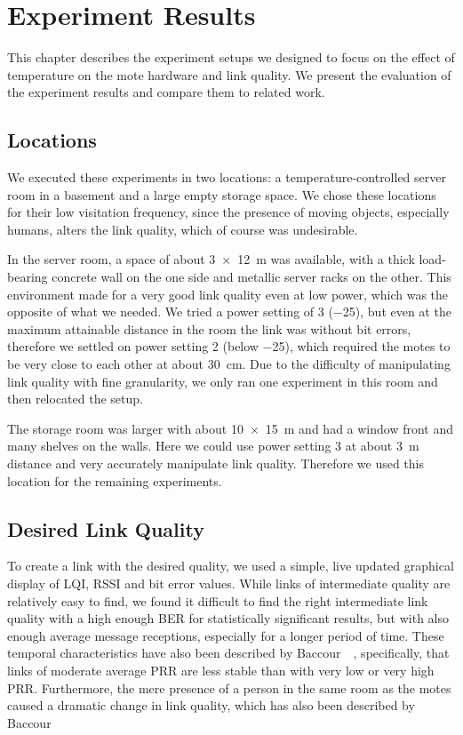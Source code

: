 \chapter{Experiment Results}
\label{chap:experiments}

This chapter describes the experiment setups we designed to focus on the effect of temperature on the mote hardware and link quality.
We present the evaluation of the experiment results and compare them to related work.

\section{Locations}

We executed these experiments in two locations: a temperature-controlled server room in a basement and a large empty storage space.
We chose these locations for their low visitation frequency, since the presence of moving objects, especially humans, alters the link quality, which of course was undesirable.

In the server room, a space of about \SI{3 x 12}{\metre} was available, with a thick load-bearing concrete wall on the one side and metallic server racks on the other.
This environment made for a very good link quality even at low power, which was the opposite of what we needed.
We tried a power setting of 3 (\SI{-25}{\dBm}), but even at the maximum attainable distance in the room the link was without bit errors, therefore we settled on power setting 2 (below \SI{-25}{\dBm}), which required the motes to be very close to each other at about \SI{30}{\centi\metre}.
Due to the difficulty of manipulating link quality with fine granularity, we only ran one experiment in this room and then relocated the setup.

The storage room was larger with about \SI{10 x 15}{\metre} and had a window front and many shelves on the walls.
Here we could use power setting 3 at about \SI{3}{\metre} distance and very accurately manipulate link quality.
Therefore we used this location for the remaining experiments.

\section{Desired Link Quality}
\label{sec:link_quality}

To create a link with the desired quality, we used a simple, live updated graphical display of \ac{LQI}, \ac{RSSI} and bit error values.
While links of intermediate quality are relatively easy to find, we found it difficult to find the right intermediate link quality with a high enough \ac{BER} for statistically significant results, but with also enough average message receptions, especially for a longer period of time.
These temporal characteristics have also been described by Baccour~\etal~\cite{Baccour2012}, specifically, that links of moderate average \ac{PRR} are less stable than with very low or very high \ac{PRR}.
Furthermore, the mere presence of a person in the same room as the motes caused a dramatic change in link quality, which has also been described by Baccour~\etal

